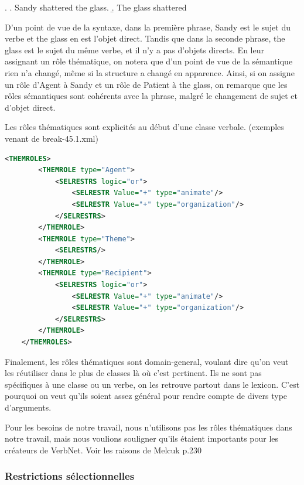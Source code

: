\ex. \label{semantic roles}
	\a. Sandy shattered the glass.
	\b. The glass shattered

D'un point de vue de la syntaxe, dans la première phrase, Sandy est le sujet du verbe et the glass en est l'objet direct. Tandis que dans la seconde phrase, the glass est le sujet du même verbe, et il n'y a pas d'objets directs. En leur assignant un rôle thématique, on notera que d'un point de vue de la sémantique rien n'a changé, même si la structure a changé en apparence. Ainsi, si on assigne un rôle d'Agent à Sandy et un rôle de Patient à the glass, on remarque que les rôles sémantiques sont cohérents avec la phrase, malgré le changement de sujet et d'objet direct.

Les rôles thématiques sont explicités au début d'une classe verbale. (exemples venant de break-45.1.xml) 

\begin{lstlisting}[language=XML, caption = les rôles thématiques]
    <THEMROLES>
        <THEMROLE type="Agent">
            <SELRESTRS logic="or">
                <SELRESTR Value="+" type="animate"/>
                <SELRESTR Value="+" type="organization"/>
            </SELRESTRS>
        </THEMROLE>
        <THEMROLE type="Theme">
            <SELRESTRS/>
        </THEMROLE>
        <THEMROLE type="Recipient">
            <SELRESTRS logic="or">
                <SELRESTR Value="+" type="animate"/>
                <SELRESTR Value="+" type="organization"/>
            </SELRESTRS>
        </THEMROLE>
    </THEMROLES>
\end{lstlisting}
Finalement, les rôles thématiques sont domain-general, voulant dire qu'on veut les réutiliser dans le plus de classes là où c'est pertinent. Ils ne sont pas spécifiques à une classe ou un verbe, on les retrouve partout dans le lexicon. C'est pourquoi on veut qu'ils soient assez général pour rendre compte de divers type d'arguments.

Pour les besoins de notre travail, nous n'utilisons pas les rôles thématiques dans notre travail, mais nous voulions souligner qu'ils étaient importants pour les créateurs de VerbNet. 
Voir les raisons de Melcuk p.230

\subsubsection{Restrictions sélectionnelles}

